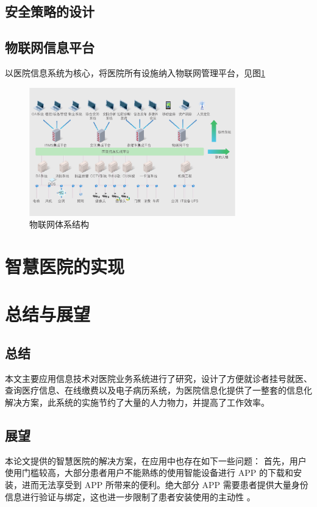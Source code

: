 \documentclass[doctor,secret]{thuthesis}
\begin{document}
\section{安全策略的设计}
\label{sec:org00099f4}

\section{物联网信息平台}
\label{sec:orgb1e5d39}

以医院信息系统为核心，将医院所有设施纳入物联网管理平台，见图\ref{fig:internetofthings}

\begin{figure}[htbp]
\centering
\includegraphics[width=0.8\textwidth]{figures/internetofthings.pdf}
\caption{物联网体系结构 \label{fig:internetofthings}}
\end{figure}

\chapter{智慧医院的实现}
\label{sec:orgb2ff467}
\chapter{总结与展望}
\label{sec:orgf402319}
\section{总结}
\label{sec:orge7362a9}
本文主要应用信息技术对医院业务系统进行了研究，设计了方便就诊者挂号就医、查询医疗信息、在线缴费以及电子病历系统，为医院信息化提供了一整套的信息化解决方案，此系统的实施节约了大量的人力物力，并提高了工作效率。
\section{展望}
\label{sec:org3942e06}
本论文提供的智慧医院的解决方案，在应用中也存在如下一些问题：
首先，用户使用门槛较高，大部分患者用户不能熟练的使用智能设备进行 APP 的下载和安装，进而无法享受到 APP 所带来的便利。绝大部分 APP 需要患者提供大量身份信息进行验证与绑定，这也进一步限制了患者安装使用的主动性 \cite{__2013}。
\end{document}
